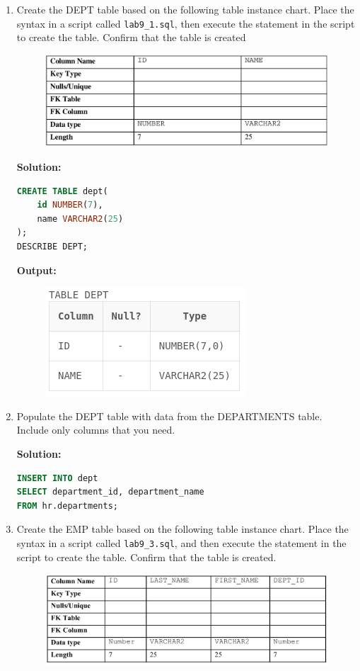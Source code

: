 \begin{enumerate}

\item Create the DEPT table based on the following table instance chart. Place the
syntax in a script called \texttt{lab9\_1.sql}, then execute the statement in the script to create the table.
Confirm that the table is created
\begin{figure}[h]
\centering
    \includegraphics[width=.7\linewidth]{graphics/91.png}
\end{figure}

\textbf{Solution: }
\begin{lstlisting}[language=SQL]
CREATE TABLE dept(
    id NUMBER(7),
    name VARCHAR2(25)
);
DESCRIBE DEPT;
\end{lstlisting}
\textbf{Output: }
\begin{figure}[h]
    \centering
    \includegraphics[width=0.5\linewidth]{graphics/p91.png}
\end{figure}

\item Populate the DEPT table with data from the DEPARTMENTS table. Include only columns that
you need.

\textbf{Solution: }
\begin{lstlisting}[language=SQL]
INSERT INTO dept
SELECT department_id, department_name
FROM hr.departments;
\end{lstlisting}

\item Create the EMP table based on the following table instance chart. Place the syntax in a script called
\texttt{lab9\_3.sql}, and then execute the statement in the script to create the table. Confirm that the table is
created.
\begin{figure}[h]
\centering
    \includegraphics[width=.7\linewidth]{graphics/93.png}
\end{figure}


\end{enumerate}
